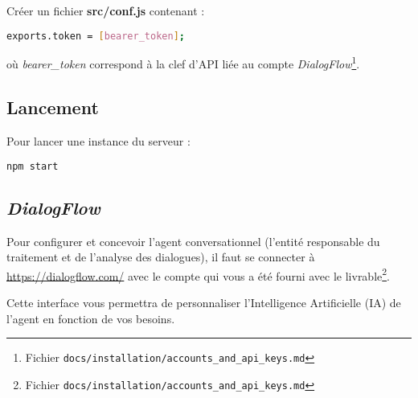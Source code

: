 Créer un fichier \textbf{src/conf.js} contenant :
\begin{lstlisting}[language=bash]
    exports.token = [bearer_token];
\end{lstlisting}

où \og \emph{bearer\_token} \fg{} correspond à la clef d'API liée au compte \emph{DialogFlow}\footnote{Fichier \texttt{docs/installation/accounts\_and\_api\_keys.md}}.

\subsection{Lancement}

Pour lancer une instance du serveur :
\begin{lstlisting}[language=bash]
    npm start
\end{lstlisting}

\subsection{\emph{DialogFlow}}

Pour configurer et concevoir l'agent conversationnel (l'entité responsable du traitement et de l'analyse des dialogues), il faut se connecter à \url{https://dialogflow.com/} avec le compte
qui vous a été fourni avec le livrable\footnote{Fichier \texttt{docs/installation/accounts\_and\_api\_keys.md}}. 

Cette interface vous permettra de personnaliser l'Intelligence Artificielle (IA) de l'agent en fonction de vos besoins.
